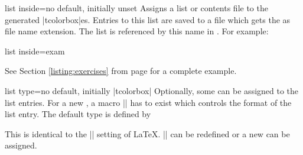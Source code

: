 \begin{newTcbKey}{list inside}{=}{no default, initially unset}
Assigns a list or contents file to the generated |tcolorbox|es.
Entries to this list are saved to a file which gets the  as
file name extension. The list is referenced by this name in
.
For example:
\begin{dispListing}
list inside=exam
\end{dispListing}
See Section \ref{listing:exercises} from page \pageref{listing:exercises}
for a complete example.
\end{newTcbKey}


\begin{newTcbKey}{list type}{=}{no default, initially |tcolorbox|}
Optionally, some  can be assigned to the list entries.
For a new , a macro |\l@| has to exist which controls
the format of the list entry. The default type is defined by
\begin{dispListing}
\newcommand*\l@tcolorbox{\@dottedtocline{1}{1.5em}{2.3em}}
\end{dispListing}
This is identical to the |\l@section| setting of \LaTeX. |\l@tcolorbox| can
be redefined or a new  can be assigned.
\end{newTcbKey}


